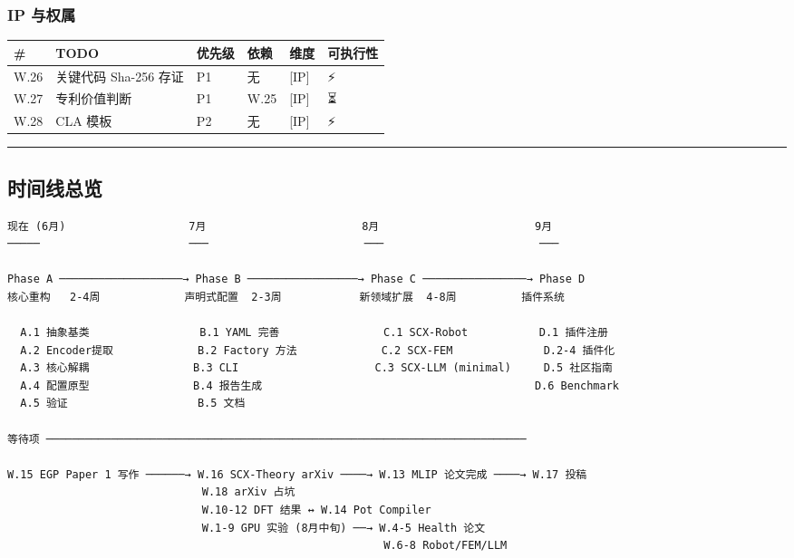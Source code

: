 \documentclass[
  12pt,
]{ctexart}
\begin{document}
\subsubsection{IP 与权属}\label{ip-ux4e0eux6743ux5c5e}

\begin{longtable}[]{@{}llllll@{}}
\toprule\noalign{}
\# & TODO & 优先级 & 依赖 & 维度 & 可执行性 \\
\midrule\noalign{}
\endhead
\bottomrule\noalign{}
\endlastfoot
W.26 & 关键代码 Sha-256 存证 & P1 & 无 & {[}IP{]} & ⚡ \\
W.27 & 专利价值判断 & P1 & W.25 & {[}IP{]} & ⏳ \\
W.28 & CLA 模板 & P2 & 无 & {[}IP{]} & ⚡ \\
\end{longtable}

\begin{center}\rule{0.5\linewidth}{0.5pt}\end{center}

\subsection{时间线总览}\label{ux65f6ux95f4ux7ebfux603bux89c8}

\begin{verbatim}
现在 (6月)                   7月                        8月                        9月
─────                       ───                        ───                        ───

Phase A ───────────────────→ Phase B ─────────────────→ Phase C ────────────────→ Phase D
核心重构   2-4周             声明式配置  2-3周            新领域扩展  4-8周          插件系统
                                                                                 
  A.1 抽象基类                 B.1 YAML 完善                C.1 SCX-Robot           D.1 插件注册
  A.2 Encoder提取             B.2 Factory 方法             C.2 SCX-FEM              D.2-4 插件化
  A.3 核心解耦                B.3 CLI                     C.3 SCX-LLM (minimal)     D.5 社区指南
  A.4 配置原型                B.4 报告生成                                          D.6 Benchmark
  A.5 验证                    B.5 文档
                                                                                 
等待项 ──────────────────────────────────────────────────────────────────────────
                                                                                 
W.15 EGP Paper 1 写作 ──────→ W.16 SCX-Theory arXiv ────→ W.13 MLIP 论文完成 ────→ W.17 投稿
                              W.18 arXiv 占坑                                    
                              W.10-12 DFT 结果 ↔ W.14 Pot Compiler
                              W.1-9 GPU 实验 (8月中旬) ──→ W.4-5 Health 论文
                                                          W.6-8 Robot/FEM/LLM
\end{verbatim}
\end{document}

